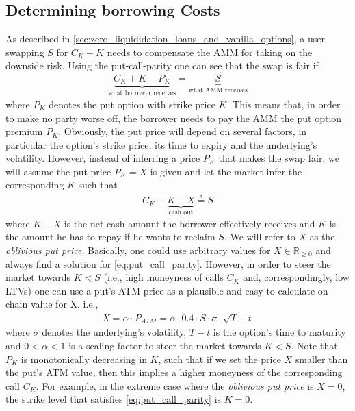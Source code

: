\documentclass[a4paper]{article}
\begin{document}
\subsection{Determining borrowing Costs}
\label{sec:borrowing_costs}
As described in \cref{sec:zero_liquididation_loans_and_vanilla_options}, a user swapping $S$ for $C_K+K$ needs to compensate the AMM for taking on the downside risk. Using the put-call-parity one can see that the swap is fair if
\begin{equation}
\begin{split}
\underbrace{C_K+K-P_K}_{\textrm{what borrower receives}} = \underbrace{S}_{\textrm{what AMM receives}}
\end{split}
\end{equation}
where $P_K$ denotes the put option with strike price $K$. This means that, in order to make no party worse off, the borrower needs to pay the AMM the put option premium $P_K$. Obviously, the put price will depend on several factors, in particular the option's strike price, its time to expiry and the underlying's volatility. However, instead of inferring a price $P_K$ that makes the swap fair, we will assume the put price $P_K\stackrel{!}{=}X$ is given and let the market infer the corresponding $K$ such that
\begin{equation}
\label{eq:put_call_parity}
\begin{split}
C_K+ \underbrace{K-X}_{\textrm{cash out}} \stackrel{!}{=} S
\end{split}
\end{equation}
where $K-X$ is the net cash amount the borrower effectively receives and $K$ is the amount he has to repay if he wants to reclaim $S$. We will refer to $X$ as the \emph{oblivious put price}. Basically, one could use arbitrary values for $X\in \mathbb R_{\ge 0}$ and always find a solution for \cref{eq:put_call_parity}. However, in order to steer the market towards $K<S$ (i.e., high moneyness of calls $C_K$ and, correspondingly, low LTVs) one can use a put's ATM price as a plausible and easy-to-calculate on-chain value for X, i.e.,
\begin{equation}
\begin{split}
\label{eq:oblivious_put_price}
X = \alpha \cdot  P_{ATM} = \alpha \cdot 0.4 \cdot  S \cdot \sigma \cdot \sqrt{T-t}
\end{split}
\end{equation}
where $\sigma$ denotes the underlying's volatility, $T-t$ is the option's time to maturity and $0<\alpha<1$ is a scaling factor to steer the market towards $K<S$. Note that $P_K$ is monotonically decreasing in $K$, such that if we set the price $X$ smaller than the put's ATM value, then this implies a higher moneyness of the corresponding call $C_K$. For example, in the extreme case where the \emph{oblivious put price} is $X=0$, the strike level that satisfies \cref{eq:put_call_parity} is $K=0$.\\
\end{document}
